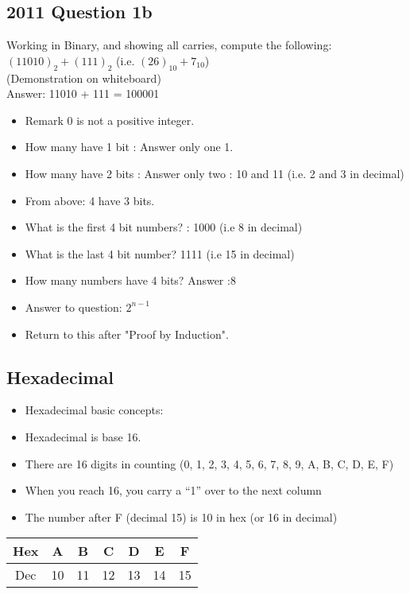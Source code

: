 \documentclass[a4paper,12pt]{article}
\begin{document}
\newpage
\subsection*{2011 Question 1b}

Working in Binary, and showing all carries, compute the following:\\
$(11010)_{2} + (111)_{2}$ (i.e. $(26)_10 +7_{10}$)
\\
(Demonstration on whiteboard)
\\
Answer: 11010 + 111 = 100001
\\


\begin{itemize} 
\item Remark 0 is not a positive integer.
\item How many have 1 bit : Answer only one 1.
\item How many have 2 bits :  Answer only two : 10 and 11 (i.e. 2 and 3 in decimal)
\item From above: 4 have 3 bits.
\item What is the first 4 bit numbers? : 1000 (i.e 8 in decimal)
\item What is the last 4 bit number? 1111 (i.e 15 in decimal)
\item How many numbers have 4 bits? Answer :8
\item Answer to question: $2^{n-1}$
\item Return to this after "Proof by Induction".
\end{itemize}
\newpage

\subsection*{Hexadecimal}
\begin{itemize}
\item Hexadecimal basic concepts:	
\item Hexadecimal is base 16.  
\item There are 16 digits in counting (0, 1, 2, 3, 4, 5, 6, 7, 8, 9, A, B, C, D, E, F)
\item When you reach 16, you carry a “1” over to the next column
\item The number after F (decimal 15) is 10 in hex (or 16 in decimal)
\end{itemize}

\begin{tabular}{|c||c|c|c|c|c|c|}
\hline Hex & A & B  & C & D & E & F \\  \hline
\hline Dec & 10 & 11 & 12 & 13  &14  &15  \\  \hline
\hline 
\end{tabular} 
\end{document}
